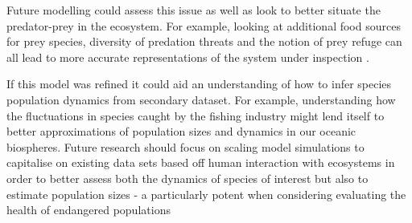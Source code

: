 \documentclass{article}
\begin{document}
Future modelling could assess this issue as well as look to better situate the predator-prey in the ecosystem. For example, looking  at additional food sources for prey species, diversity of predation threats and the notion of prey refuge can all lead to more accurate representations of the system under inspection \parencite{chakraborty_interactive_2017, tyson_modelling_2010,lin_spreading_2011, sih_prey_1987}. 

If this model was refined it could aid an understanding of how to infer species population dynamics from secondary dataset. For example, understanding how the fluctuations in species caught by the fishing industry might lend itself to better approximations of population sizes and dynamics in our oceanic biospheres. Future research should focus on scaling model simulations to capitalise on existing data sets based off human interaction with ecosystems in order to better assess both the dynamics of species of interest but also to estimate population sizes - a particularly potent when considering evaluating the health of endangered populations
\clearpage
\section{}
\printbibliography
\end{document}
